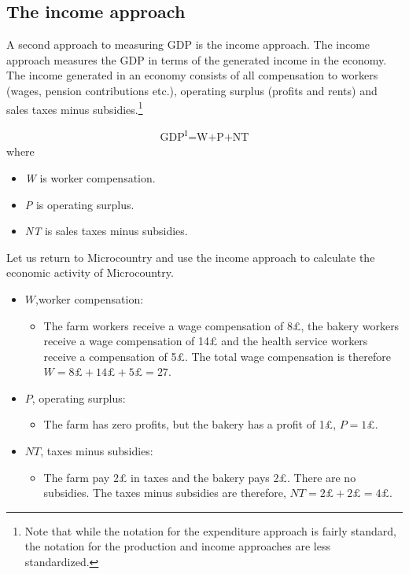 \documentclass[
]{book}
\providecommand{\tightlist}{%
  \setlength{\itemsep}{0pt}\setlength{\parskip}{0pt}}
\begin{document}
\hypertarget{the-income-approach}{%
\subsection*{The income approach}\label{the-income-approach}}

A second approach to measuring GDP is the income approach. The income approach measures the GDP in terms of the generated income in the economy. The income generated in an economy consists of all compensation to workers (wages, pension contributions etc.), operating surplus (profits and rents) and sales taxes minus subsidies.\footnote{Note that while the notation for the expenditure approach is fairly standard, the notation for the production and income approaches are less standardized.}

\begin{align}
   \text{GDP}^{\text{I}} \text{=W+P+NT}
\end{align}
where

\begin{itemize}
\tightlist
\item
  \emph{W} is worker compensation.
\item
  \emph{P} is operating surplus.
\item
  \emph{NT} is sales taxes minus subsidies.
\end{itemize}

Let us return to Microcountry and use the income approach to calculate the economic activity of Microcountry.

\begin{itemize}
\item
  \(W\),worker compensation:

  \begin{itemize}
  \tightlist
  \item
    The farm workers receive a wage compensation of 8£, the bakery workers receive a wage compensation of 14£ and the health service workers receive a compensation of 5£. The total wage compensation is therefore \(W=8£+14£+5£=27\).
  \end{itemize}
\item
  \(P\), operating surplus:

  \begin{itemize}
  \tightlist
  \item
    The farm has zero profits, but the bakery has a profit of 1£, \(P=1£\).
  \end{itemize}
\item
  \(NT\), taxes minus subsidies:

  \begin{itemize}
  \tightlist
  \item
    The farm pay 2£ in taxes and the bakery pays 2£. There are no subsidies. The taxes minus subsidies are therefore, \(NT=2£+2£=4£\).
  \end{itemize}
\end{itemize}
\end{document}
